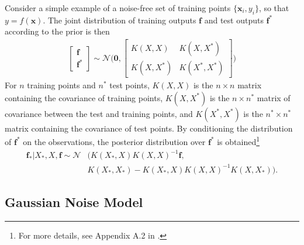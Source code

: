 \documentclass[twoside,english]{uiofysmaster}
\begin{document}
Consider a simple example of a noise-free set of training points $\{\textbf{x}_i, y_i\}$, so that $y = f(\textbf{x})$. The joint distribution of training outputs $\textbf{f}$ and test outputs $\textbf{f}^*$ according to the prior is then
\begin{align}
\begin{bmatrix}
\textbf{f}\\
\textbf{f}^*
\end{bmatrix}
\sim 
\mathcal{N} \Bigg(
\boldsymbol{0},
\begin{bmatrix}
K(X, X) & K(X, X^*)\\
K(X, X^*) & K(X^*, X^*)
\end{bmatrix}
 \Bigg)
\end{align}
For $n$ training points and $n^*$ test points, $K(X,X)$ is the $n \times n$ matrix containing the covariance of training points, $K(X, X^*)$ is the $n \times n^*$ matrix of covariance between the test and training points, and $K(X^*, X^*)$ is the $n^* \times n^*$ matrix containing the covariance of test points. By conditioning the distribution of $\textbf{f}^*$ on the observations,  the posterior distribution over $\textbf{f}^*$ is obtained\footnote{For more details, see Appendix A.2 in \cite{rasmussen2006gaussian}.}  \cite{rasmussen2006gaussian} 
\begin{align}
\textbf{f}_* \big| X_*, X, \textbf{f} \sim \mathcal{N}&(K(X_*, X)K(X, X)^{-1} \textbf{f},\\ &K(X_*, X_*) - K(X_*, X)K(X, X)^{-1}K(X, X_*)).
\end{align}

\subsection{Gaussian Noise Model}
\end{document}
